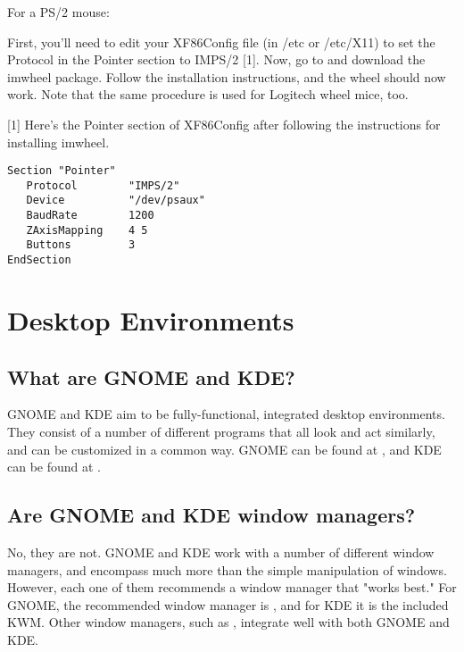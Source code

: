 \documentclass[a4paper]{article}
\begin{document}
For a PS/2 mouse:

First, you'll need to edit your XF86Config file (in /etc or
/etc/X11) to set the Protocol in the Pointer section to IMPS/2 {[}1].
Now, go to  and download
the imwheel package.  Follow the installation instructions, and the
wheel should now work.  Note that the same procedure is used for
Logitech wheel mice, too.

{[}1] Here's the Pointer section of XF86Config after following the
instructions for installing imwheel.  

\begin{tscreen}
\begin{verbatim}
Section "Pointer"
   Protocol        "IMPS/2"
   Device          "/dev/psaux"
   BaudRate        1200
   ZAxisMapping    4 5
   Buttons         3
EndSection
\end{verbatim}
\end{tscreen}





\section{Desktop Environments}


\subsection{What are GNOME and KDE?}

GNOME and KDE aim to be fully-functional, integrated desktop
environments.  They consist of a number of different programs that all
look and act similarly, and can be customized in a common way.  GNOME
can be found at , and KDE can be found at .




\subsection{Are GNOME and KDE window managers?}

No, they are not.  GNOME and KDE work with a number of different window
managers, and encompass much more than the simple manipulation of
windows.  However, each one of them recommends a window manager that
"works best."  For GNOME, the recommended window manager is , and for KDE
it is the included KWM.  Other window managers, such as , integrate well
with both GNOME and KDE.
\end{document}
